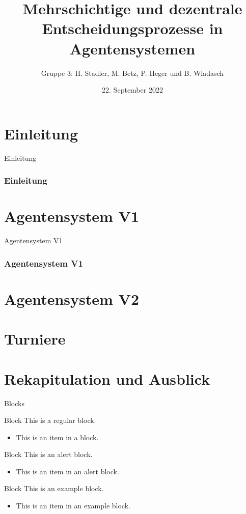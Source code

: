 \documentclass{beamer} %
\title{Mehrschichtige und dezentrale
Entscheidungsprozesse in Agentensystemen}
\author[H. Stadler, M. Betz]{Gruppe 3: H. Stadler, M. Betz, P. Heger und B. Wladasch}
\institute{Artificial Intelligence Group,\\
University of Hagen, Germany}
\date{22. September 2022}
\begin{document}

\begin{frame}
  \titlepage
\end{frame}
\nologo

\section{Einleitung}
\begin{frame}{Einleitung}
\frametitle{Einleitung}
\end{frame}

\section{Agentensystem V1}
\begin{frame}{Agentensystem V1}
\frametitle{Agentensystem V1}
\end{frame}

\section{Agentensystem V2}

\section{Turniere}

\section{Rekapitulation und Ausblick}

\begin{frame}{Blocks}
    \begin{block}{Block}
        This is a regular block.
        \begin{itemize}
            \item This is an item in a block.
        \end{itemize}
    \end{block}
    
    \begin{alertblock}{Block}
        This is an alert block.
        \begin{itemize}
            \item This is an item in an alert block.
        \end{itemize}
    \end{alertblock}
    
    \begin{exampleblock}{Block}
        This is an example block.
        \begin{itemize}
            \item This is an item in an example block.
        \end{itemize}
    \end{exampleblock}
\end{frame}
\end{document}

